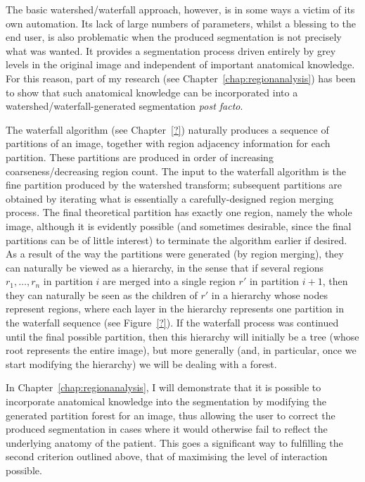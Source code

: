 The basic watershed/waterfall approach, however, is in some ways a victim of its own automation. Its lack of large numbers of parameters, whilst a blessing to the end user, is also problematic when the produced segmentation is not precisely what was wanted. It provides a segmentation process driven entirely by grey levels in the original image and independent of important anatomical knowledge. For this reason, part of my research (see Chapter~\ref{chap:regionanalysis}) has been to show that such anatomical knowledge can be incorporated into a watershed/waterfall-generated segmentation \emph{post facto}.

The waterfall algorithm (see Chapter~\ref{?}) naturally produces a sequence of partitions of an image, together with region adjacency information for each partition. These partitions are produced in order of increasing coarseness/decreasing region count. The input to the waterfall algorithm is the fine partition produced by the watershed transform; subsequent partitions are obtained by iterating what is essentially a carefully-designed region merging process. The final theoretical partition has exactly one region, namely the whole image, although it is evidently possible (and sometimes desirable, since the final partitions can be of little interest) to terminate the algorithm earlier if desired. As a result of the way the partitions were generated (by region merging), they can naturally be viewed as a hierarchy, in the sense that if several regions $r_1,\ldots,r_n$ in partition $i$ are merged into a single region $r'$ in partition $i+1$, then they can naturally be seen as the children of $r'$ in a hierarchy whose nodes represent regions, where each layer in the hierarchy represents one partition in the waterfall sequence (see Figure~\ref{?}). If the waterfall process was continued until the final possible partition, then this hierarchy will initially be a tree (whose root represents the entire image), but more generally (and, in particular, once we start modifying the hierarchy) we will be dealing with a forest.

In Chapter~\ref{chap:regionanalysis}, I will demonstrate that it is possible to incorporate anatomical knowledge into the segmentation by modifying the generated partition forest for an image, thus allowing the user to correct the produced segmentation in cases where it would otherwise fail to reflect the underlying anatomy of the patient. This goes a significant way to fulfilling the second criterion outlined above, that of maximising the level of interaction possible.

\fi